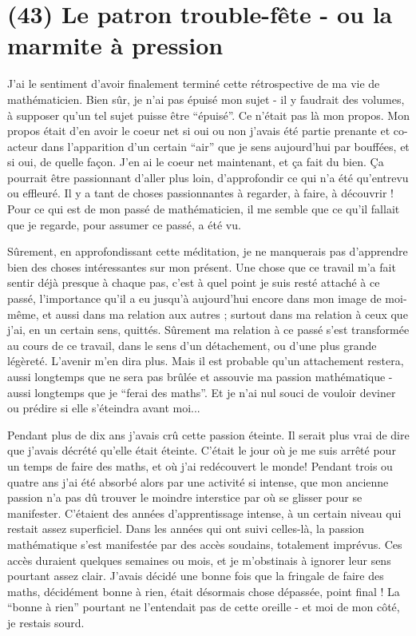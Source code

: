 \section{(43) Le patron trouble-fête - ou la marmite à pression}

J'ai le sentiment d'avoir finalement terminé cette rétrospective de ma vie de mathématicien. Bien sûr, je n'ai pas épuisé mon sujet - il y faudrait des volumes, à supposer qu'un tel sujet puisse être ``épuisé''. Ce n'était pas là mon propos. Mon propos était d'en avoir le coeur net si oui ou non j'avais été partie prenante et co-acteur dans l'apparition d'un certain ``air'' que je sens aujourd'hui par bouffées, et si oui, de quelle façon. J'en ai le coeur net maintenant, et ça fait du bien. Ça pourrait être passionnant d'aller plus loin, d'approfondir ce qui n'a été qu'entrevu ou effleuré. Il y a tant de choses passionnantes à regarder, à faire, à découvrir ! Pour ce qui est de mon passé de mathématicien, il me semble que ce qu'il fallait que je regarde, pour assumer ce passé, a été vu.

Sûrement, en approfondissant cette méditation, je ne manquerais pas d'apprendre bien des choses intéressantes sur mon présent. Une chose que ce travail m'a fait sentir déjà presque à chaque pas, c'est à quel point je suis resté attaché à ce passé, l'importance qu'il a eu jusqu'à aujourd'hui encore dans mon image de moi-même, et aussi dans ma relation aux autres ; surtout dans ma relation à ceux que j'ai, en un certain sens, quittés. Sûrement ma relation à ce passé s'est transformée au cours de ce travail, dans le sens d'un détachement, ou d'une plus grande légèreté. L'avenir m'en dira plus. Mais il est probable qu'un attachement restera, aussi longtemps que ne sera pas brûlée et assouvie ma passion mathématique - aussi longtemps que je ``ferai des maths''. Et je n'ai nul souci de vouloir deviner ou prédire si elle s'éteindra avant moi...

Pendant plus de dix ans j'avais crû cette passion éteinte. Il serait plus vrai de dire que j'avais décrété qu'elle était éteinte. C'était le jour où je me suis arrêté pour un temps de faire des maths, et où j'ai redécouvert le monde! Pendant trois ou quatre ans j'ai été absorbé alors par une activité si intense, que mon ancienne passion n'a pas dû trouver le moindre interstice par où se glisser pour se manifester. C'étaient des années d'apprentissage intense, à un certain niveau qui restait assez superficiel. Dans les années qui ont suivi celles-là, la passion mathématique s'est manifestée par des accès soudains, totalement imprévus. Ces accès duraient quelques semaines ou mois, et je m'obstinais à ignorer leur sens pourtant assez clair. J'avais décidé une bonne fois que la fringale de faire des maths, décidément bonne à rien, était désormais chose dépassée, point final ! La ``bonne à rien'' pourtant ne l'entendait pas de cette oreille - et moi de mon côté, je restais sourd.

